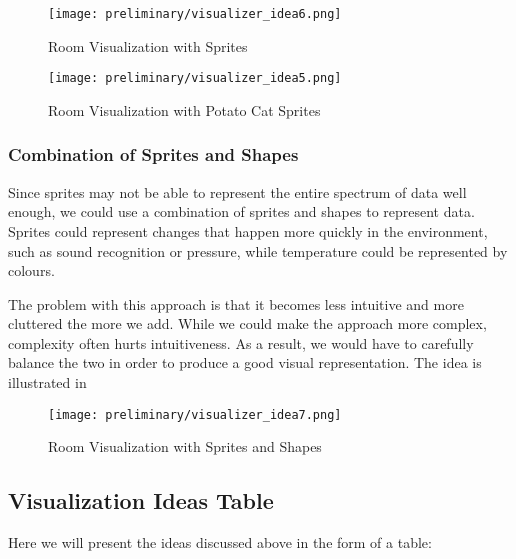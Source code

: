 \documentclass[../document]{subfiles}
\begin{document}
\begin{figure}
	\texttt{[image: preliminary/visualizer\_idea6.png]}
	\caption{Room Visualization with Sprites}
	\label{fig:visualizer_idea6}
\end{figure}

\begin{figure}
	\texttt{[image: preliminary/visualizer\_idea5.png]}
	\caption{Room Visualization with Potato Cat Sprites}
	\label{fig:visualizer_idea5}
\end{figure}

\subsubsection{Combination of Sprites and Shapes}

Since sprites may not be able to represent the entire spectrum of data well enough, we could use a combination of sprites and shapes to represent data. Sprites could represent changes that happen more quickly in the environment, such as sound recognition or pressure, while temperature could be represented by colours.

The problem with this approach is that it becomes less intuitive and more cluttered the more we add. While we could make the approach more complex, complexity often hurts intuitiveness. As a result, we would have to carefully balance the two in order to produce a good visual representation. The idea is illustrated in 

\begin{figure}
\texttt{[image: preliminary/visualizer\_idea7.png]}
\caption{Room Visualization with Sprites and Shapes}
\label{fig:visualizer_idea7}
\end{figure}

\subsection{Visualization Ideas Table}
Here we will present the ideas discussed above in the form of a table:
\end{document}
